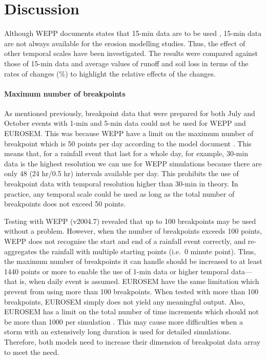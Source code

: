 \section{Discussion}
\label{sec:TemporalScalesDiscussion}

Although WEPP documents states that 15-min data are to be used
\citep{flanagan1995-weppusersummary}, 15-min data are not always available for
the erosion modelling studies. Thus, the effect of other temporal scales have
been investigated. The results were compared against those of 15-min data and
average values of runoff and soil loss in terms of the rates of changes (\%) to
highlight the relative effects of the changes.

\paragraph{Maximum number of breakpoints} As mentioned previously, breakpoint
data that were prepared for both July and October events with 1-min and 5-min
data could not be used for WEPP and EUROSEM. This was because WEPP have a limit
on the maximum number of breakpoint which is 50 points per day according to the
model document \citep[see][page 10]{flanagan1995-weppusersummary}. This means
that, for a rainfall event that last for a whole day, for example, 30-min data
is the highest resolution we can use for WEPP simulations because there are only
48 (24 hr/0.5 hr) intervals available per day. This prohibits the use of
breakpoint data with temporal resolution higher than 30-min in theory. In
practice, any temporal scale could be used as long as the total number of
breakpoints does not exceed 50 points.

Testing with WEPP (v2004.7) revealed that up to 100 breakpoints may be used
without a problem. However, when the number of breakpoints exceeds 100
points, WEPP does not recognise the start and end of a rainfall event correctly,
and re-aggregates the rainfall with multiple starting points (i.e.\ 0 minute
point). Thus, the maximum number of breakpoints it can handle should be
increased to at least 1440 points or more to enable the use of 1-min data or
higher temporal data---that is, when daily event is assumed. EUROSEM have the
same limitation which prevent from using more than 100 breakpoints. When tested
with more than 100 breakpoints, EUROSEM simply does not yield any meaningful
output. Also, EUROSEM has a limit on the total number of time increments which
should not be more than 1000 per simulation
\citep{morgan1998-europeansoilerosion}. This may cause more difficulties when a
storm with an extensively long duration is used for detailed simulations.
Therefore, both models need to increase their dimension of breakpoint data array
to meet the need.

